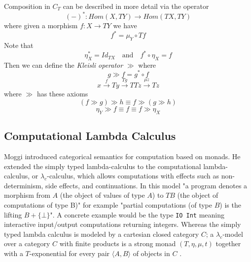 Composition in $C_T$ can be described in more detail via the operator
\begin{equation}
    (-)^{*} : Hom(X, TY) \rightarrow Hom(TX, TY)
\end{equation}
where given a morphism $f: X \rightarrow TY$ we have
\begin{equation}
    f^{*} = \mu_{Y} \circ Tf
\end{equation}
Note that
\begin{equation}
    \eta_{X}^{*} = Id_{TX}
    \quad\textrm{and}\quad
    f^{*} \circ \eta _{X} = f
\end{equation}
Then we can define the \textit{Kleisli operator} $\gg$ where
\begin{equation}
    g \gg f = g^{*} \circ f
\end{equation}
\begin{equation}
    x
    \stackrel{f}{\rightarrow}     T y
    \stackrel{T g}{\rightarrow}   T T z
    \stackrel{\mu z}{\rightarrow} T z
\end{equation}
where $\gg$ has these axioms
\begin{equation}
    (f \gg g) \gg h \equiv f \gg (g \gg h)
\end{equation}
\begin{equation}
    \eta_Y \gg f \equiv f \equiv f \gg \eta_X
\end{equation}

\subsection{Computational Lambda Calculus}
Moggi \cite{moggi1989computational}
introduced categorical semantics for computation based on monads.
He extended the simply typed lambda-calculus to
the computational lambda-calculus, or $\lambda_c$-calculus,
which allows computations with effects such as
non-determinism, side effects, and continuations.
In this model "a program denotes a morphism from $A$
(the object of values of type $A$) to $TB$
(the object of computations of type B)"
for example
"partial computations (of type $B$) is the lifting $B + \{\bot\}$".
A concrete example would be the type \texttt{IO Int}
meaning interactive input/output computations returning integers.
Whereas the simply typed lambda calculus is modeled by a cartesian closed category $C$;
a $\lambda_c$-model over a category $C$ with finite products is a strong monad $(T,\eta,\mu,t)$
together with a $T$-exponential for every pair $\langle A, B\rangle$ of objects in $C$
\cite{moggi1989computational}.

